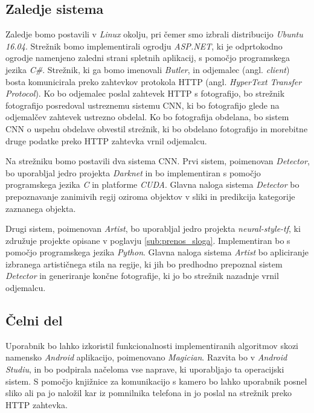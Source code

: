 \documentclass[runningheads,a4paper]{llncs}
\begin{document}
\subsection{Zaledje sistema}
Zaledje bomo postavili v \textit{Linux} okolju, pri čemer smo izbrali distribucijo \textit{Ubuntu 16.04}. Strežnik bomo implementirali ogrodju \textit{ASP.NET}, ki je odprtokodno ogrodje namenjeno zaledni strani spletnih aplikacij, s pomočjo programskega jezika \textit{C\#}. Strežnik, ki ga bomo imenovali \textit{Butler}, in odjemalec (angl. \textit{client}) bosta komunicirala preko zahtevkov protokola HTTP (angl. \textit{HyperText Transfer Protocol}). Ko bo odjemalec poslal zahtevek HTTP s fotografijo, bo strežnik fotografijo posredoval ustreznemu sistemu CNN, ki bo fotografijo glede na odjemalčev zahtevek ustrezno obdelal. Ko bo fotografija obdelana, bo sistem CNN o uspehu obdelave obvestil strežnik, ki bo obdelano fotografijo in morebitne druge podatke preko HTTP zahtevka vrnil odjemalcu. 

Na strežniku bomo postavili dva sistema CNN. Prvi sistem, poimenovan \textit{Detector}, bo uporabljal jedro projekta \textit{Darknet} in bo implementiran s pomočjo programskega jezika \textit{C} in platforme \textit{CUDA}. Glavna naloga sistema \textit{Detector} bo prepoznavanje zanimivih regij oziroma objektov v sliki in predikcija kategorije zaznanega objekta. 

Drugi sistem, poimenovan \textit{Artist}, bo uporabljal jedro projekta \textit{neural-style-tf}, ki združuje projekte opisane v poglavju \ref{sub:prenos_sloga}. Implementiran bo s pomočjo programskega jezika \textit{Python}. Glavna naloga sistema \textit{Artist} bo apliciranje izbranega artističnega stila na regije, ki jih bo predhodno prepoznal sistem \textit{Detector} in generiranje končne fotografije, ki jo bo strežnik nazadnje vrnil odjemalcu.

\subsection{Čelni del}
Uporabnik bo lahko izkoristil funkcionalnosti implementiranih algoritmov skozi namensko \textit{Android} aplikacijo, poimenovano \textit{Magician}. Razvita bo v \textit{Android Studiu}, in bo podpirala načeloma vse naprave, ki uporabljajo ta operacijski sistem. S pomočjo knjižnice za komunikacijo s kamero \cite{cwac-cam} bo lahko uporabnik posnel sliko ali pa jo naložil kar iz pomnilnika telefona in jo poslal na strežnik preko HTTP zahtevka. 
\end{document}
